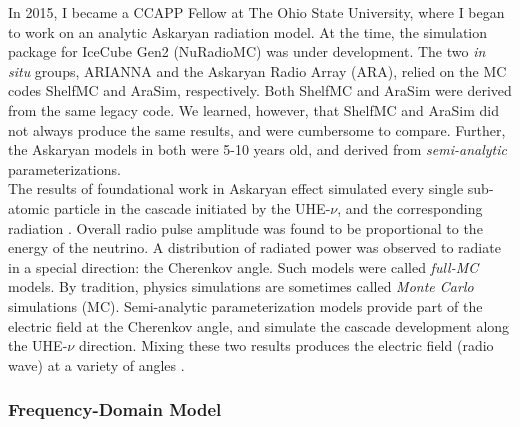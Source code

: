 \documentclass[../../../main.tex]{subfiles}
\begin{document}
In 2015, I became a CCAPP Fellow at The Ohio State University, where I began to work on an analytic Askaryan radiation model.  At the time, the simulation package for IceCube Gen2 (NuRadioMC) was under development.  The two \textit{in situ} groups, ARIANNA and the Askaryan Radio Array (ARA), relied on the MC codes ShelfMC and AraSim, respectively.  Both ShelfMC and AraSim were derived from the same legacy code.  We learned, however, that ShelfMC and AraSim did not always produce the same results, and were cumbersome to compare.  Further, the Askaryan models in both were 5-10 years old, and derived from \textit{semi-analytic} parameterizations.
\\
\vspace{0.25cm}
The results of foundational work in Askaryan effect simulated every single sub-atomic particle in the cascade initiated by the UHE-$\nu$, and the corresponding radiation \cite{zhs}.  Overall radio pulse amplitude was found to be proportional to the energy of the neutrino.  A distribution of radiated power was observed to radiate in a special direction: the Cherenkov angle.  Such models were called \textit{full-MC} models.  By tradition, physics simulations are sometimes called \textit{Monte Carlo} simulations (MC).  Semi-analytic parameterization models provide part of the electric field at the Cherenkov angle, and simulate the cascade development along the UHE-$\nu$ direction.  Mixing these two results produces the electric field (radio wave) at a variety of angles \cite{PhysRevD.101.083005}.

\subsubsection{Frequency-Domain Model}
\end{document}
